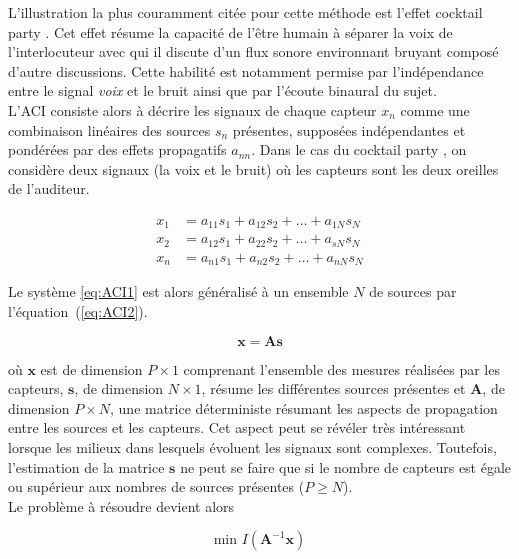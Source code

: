 L'illustration la plus couramment citée pour cette méthode est l'effet \og cocktail party \fg{} \cite{Cherry}. Cet effet résume la capacité de l'être humain à séparer la voix de l'interlocuteur avec qui il discute d'un flux sonore environnant bruyant composé d'autre discussions. Cette habilité est notamment permise par l'indépendance entre le signal \textit{voix} et le bruit ainsi que par l'écoute binaural du sujet. \\

L'ACI consiste alors à décrire les signaux de chaque capteur $x_n$ comme une combinaison linéaires des sources $s_n$ présentes, supposées indépendantes et pondérées par des effets propagatifs $a_{nn}$. Dans le cas du \og cocktail party \fg{}, on considère deux signaux (la voix et le bruit) où les capteurs sont les deux oreilles de l'auditeur. 

\begin{subequations}\label{eq:ACI1}
\begin{align}
x_1 &= a_{11} s_1 + a_{12} s_2 + \dots + a_{1N} s_N\\
x_2 &= a_{12} s_1 + a_{22} s_2 + \dots + a_{sN} s_N\\
x_n &= a_{n1} s_1 + a_{n2} s_2 + \dots + a_{nN} s_N
\end{align}
\end{subequations}

Le système \ref{eq:ACI1} est alors généralisé à un ensemble $N$ de sources par l'équation~(\ref{eq:ACI2}).

\begin{equation}\label{eq:ACI2}
\mathbf{x} = \mathbf{As}
\end{equation}

où $\mathbf{x}$ est de dimension $P \times 1$ comprenant l'ensemble des mesures réalisées par les capteurs, $\mathbf{s}$, de dimension $N \times 1$, résume les différentes sources présentes et $\mathbf{A}$, de dimension $P \times N$, une matrice déterministe résumant les aspects de propagation entre les sources et les capteurs. Cet aspect peut se révéler très intéressant lorsque les milieux dans lesquels évoluent les signaux sont complexes. Toutefois, l'estimation de la matrice $\mathbf{s}$ ne peut se faire que si le nombre de capteurs est égale ou supérieur aux nombres de sources présentes ($P \geq N$).\\

Le problème à résoudre devient alors

\begin{equation}
\text{min } I(\mathbf{A}^{-1}\mathbf{x})
\end{equation}

